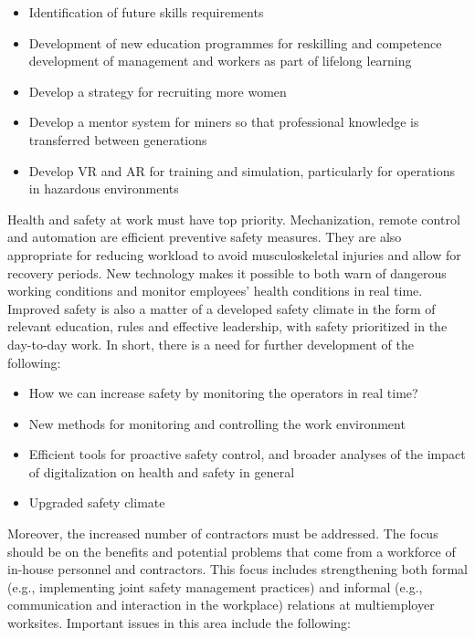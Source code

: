 \documentclass[
  12pt,
]{scrbook}
\begin{document}
\begin{itemize}
\item
  Identification of future skills requirements
\item
  Development of new education programmes for reskilling and competence development of management and workers as part of lifelong learning
\item
  Develop a strategy for recruiting more women
\item
  Develop a mentor system for miners so that professional knowledge is transferred between generations
\item
  Develop VR and AR for training and simulation, particularly for operations in hazardous environments
\end{itemize}

Health and safety at work must have top priority. Mechanization, remote control and automation are efficient preventive safety measures. They are also appropriate for reducing workload to avoid musculoskeletal injuries and allow for recovery periods. New technology makes it possible to both warn of dangerous working conditions and monitor employees' health conditions in real time. Improved safety is also a matter of a developed safety climate in the form of relevant education, rules and effective leadership, with safety prioritized in the day-to-day work. In short, there is a need for further development of the following:

\begin{itemize}
\item
  How we can increase safety by monitoring the operators in real time?
\item
  New methods for monitoring and controlling the work environment
\item
  Efficient tools for proactive safety control, and broader analyses of the impact of digitalization on health and safety in general
\item
  Upgraded safety climate
\end{itemize}

Moreover, the increased number of contractors must be addressed. The focus should be on the benefits and potential problems that come from a workforce of in-house personnel and contractors. This focus includes strengthening both formal (e.g., implementing joint safety management practices) and informal (e.g., communication and interaction in the workplace) relations at multiemployer worksites. Important issues in this area include the following:
\end{document}
